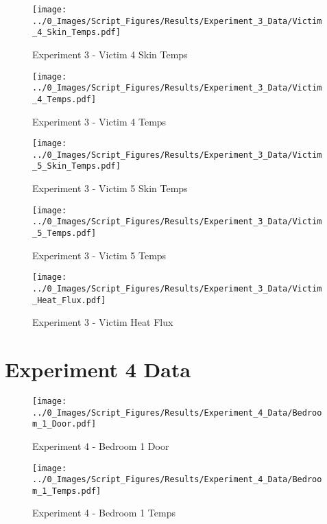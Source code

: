 	\clearpage

	\begin{figure}[H]
		\centering
		\texttt{[image: ../0\_Images/Script\_Figures/Results/Experiment\_3\_Data/Victim\_4\_Skin\_Temps.pdf]}
		\caption[]{Experiment 3 - Victim 4 Skin Temps}
	\end{figure}
 

	\begin{figure}[H]
		\centering
		\texttt{[image: ../0\_Images/Script\_Figures/Results/Experiment\_3\_Data/Victim\_4\_Temps.pdf]}
		\caption[]{Experiment 3 - Victim 4 Temps}
	\end{figure}
 
	\clearpage

	\begin{figure}[H]
		\centering
		\texttt{[image: ../0\_Images/Script\_Figures/Results/Experiment\_3\_Data/Victim\_5\_Skin\_Temps.pdf]}
		\caption[]{Experiment 3 - Victim 5 Skin Temps}
	\end{figure}
 

	\begin{figure}[H]
		\centering
		\texttt{[image: ../0\_Images/Script\_Figures/Results/Experiment\_3\_Data/Victim\_5\_Temps.pdf]}
		\caption[]{Experiment 3 - Victim 5 Temps}
	\end{figure}
 
	\clearpage

	\begin{figure}[H]
		\centering
		\texttt{[image: ../0\_Images/Script\_Figures/Results/Experiment\_3\_Data/Victim\_Heat\_Flux.pdf]}
		\caption[]{Experiment 3 - Victim Heat Flux}
	\end{figure}
 

\clearpage		\large
\section{Experiment 4 Data} \label{App:Exp4Results} 

	\begin{figure}[H]
		\centering
		\texttt{[image: ../0\_Images/Script\_Figures/Results/Experiment\_4\_Data/Bedroom\_1\_Door.pdf]}
		\caption[]{Experiment 4 - Bedroom 1 Door}
	\end{figure}
 

	\begin{figure}[H]
		\centering
		\texttt{[image: ../0\_Images/Script\_Figures/Results/Experiment\_4\_Data/Bedroom\_1\_Temps.pdf]}
		\caption[]{Experiment 4 - Bedroom 1 Temps}
	\end{figure}
 

